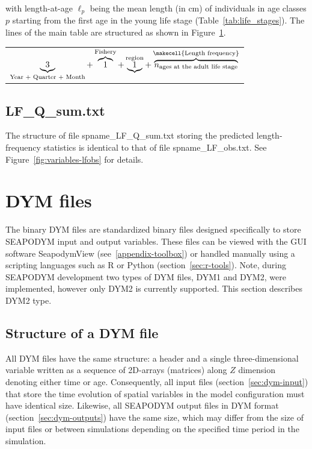 \noindent with length-at-age $\ell_p$ being the mean length (in cm) of individuals in age classes $p$ starting from the first age in the young life stage (Table~\ref{tab:life_stages}). The lines of the main table are structured as shown in Figure~\ref{fig:variables-lfqf}.

\begin{table} [H]
\begin{center}
\begin{tabular}{c}
$
\underbrace{3}_{\text{Year $+$ Quarter $+$ Month}}+\overbrace{1}^{\text{Fishery}}+\underbrace{1}^{\text{region}}+\overbrace{n_{\text{ages at the adult life stage}}}^{\text{\makecell{Length frequency}}}
$
\end{tabular}
\label{fig:variables-lfqf}
\end{center}
\end{table}

\subsection{LF\_Q\_sum.txt}\label{annex:sumlf}

The structure of file {\ttfamily spname\_LF\_Q\_sum.txt} storing the predicted length-frequency statistics is identical to that of file {\ttfamily spname\_LF\_obs.txt}. See Figure~\ref{fig:variables-lfobs} for details. 

\section{{\ttfamily DYM} files}\label{annex:dymfile}

The binary DYM files are standardized binary files designed specifically to store SEAPODYM input and output variables. These files can be viewed with the GUI software SeapodymView (see~\ref{appendix-toolbox}) or handled manually using a scripting languages such as R or Python (section~\ref{sec:r-tools}). Note, during SEAPODYM development two types of DYM files, DYM1 and DYM2, were implemented, however only DYM2 is currently supported. This section describes DYM2 type.
 
\subsection{Structure of a DYM file}\label{appendix-DYMfiles}

All DYM files have the same structure: a header and a single three-dimensional variable written as a sequence of 2D-arrays (matrices) along $Z$ dimension denoting either time or age. Consequently, all input files (section~\ref{sec:dym-input}) that store the time evolution of spatial variables in the model configuration must have identical size. Likewise, all SEAPODYM output files in DYM format (section~\ref{sec:dym-outputs}) have the same size, which may differ from the size of input files or between simulations depending on the specified time period in the simulation.  

